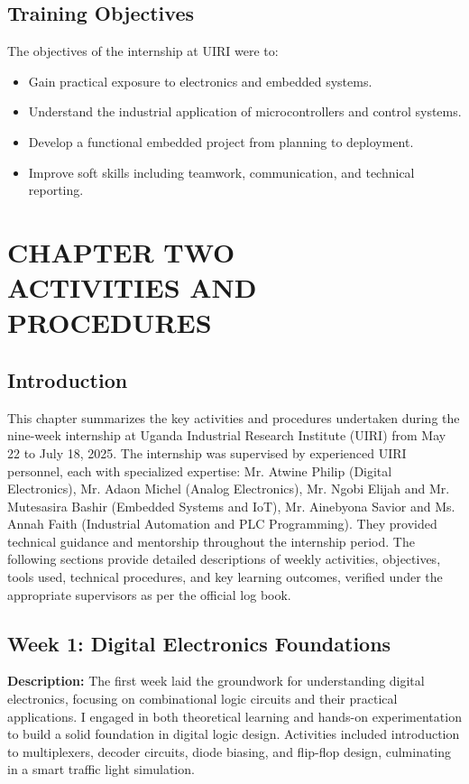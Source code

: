 \documentclass[12pt,a4paper]{report}
\begin{document}
\section{Training Objectives}
\noindent The objectives of the internship at UIRI were to:
\begin{itemize}
    \item Gain practical exposure to electronics and embedded systems.
    \item Understand the industrial application of microcontrollers and control systems.
    \item Develop a functional embedded project from planning to deployment.
    \item Improve soft skills including teamwork, communication, and technical reporting.
\end{itemize}

\newpage
\chapter[CHAPTER TWO ACTIVITIES AND PROCEDURES]{CHAPTER TWO \\ACTIVITIES AND PROCEDURES}

\section{Introduction}

\noindent This chapter summarizes the key activities and procedures undertaken during the nine-week internship at Uganda Industrial Research Institute (UIRI) from May 22 to July 18, 2025. The internship was supervised by experienced UIRI personnel, each with specialized expertise: Mr. Atwine Philip (Digital Electronics), Mr. Adaon Michel (Analog Electronics), Mr. Ngobi Elijah and Mr. Mutesasira Bashir (Embedded Systems and IoT), Mr. Ainebyona Savior and Ms. Annah Faith (Industrial Automation and PLC Programming). They provided technical guidance and mentorship throughout the internship period. The following sections provide detailed descriptions of weekly activities, objectives, tools used, technical procedures, and key learning outcomes, verified under the appropriate supervisors as per the official log book.

\section{Week 1: Digital Electronics Foundations}

\noindent\textbf{Description:} The first week laid the groundwork for understanding digital electronics, focusing on combinational logic circuits and their practical applications. I engaged in both theoretical learning and hands-on experimentation to build a solid foundation in digital logic design. Activities included introduction to multiplexers, decoder circuits, diode biasing, and flip-flop design, culminating in a smart traffic light simulation.
\end{document}
